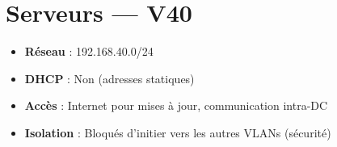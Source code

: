 \section{Serveurs — V40}

\begin{itemize}
    \item \textbf{Réseau} : 192.168.40.0/24
    \item \textbf{DHCP} : Non (adresses statiques)
    \item \textbf{Accès} : Internet pour mises à jour, communication intra-DC
    \item \textbf{Isolation} : Bloqués d'initier vers les autres VLANs (sécurité)
\end{itemize}
